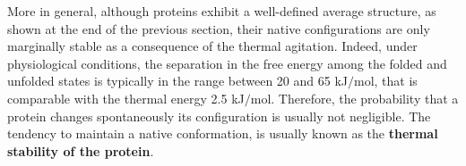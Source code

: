 %
%
%


More in general, although proteins exhibit a well-defined average structure, as shown at the end of the previous section, their native configurations are only marginally stable as a consequence of the thermal agitation. Indeed, under physiological conditions, the separation in the free energy among the folded and unfolded states is typically in the range between 20 and 65 kJ$/$mol, that is comparable with the thermal energy 2.5 kJ$/$mol. Therefore, the probability that a protein changes spontaneously its configuration is usually not negligible. 
The tendency to maintain a native conformation, is usually known as the \textbf{thermal stability of the protein}. 


